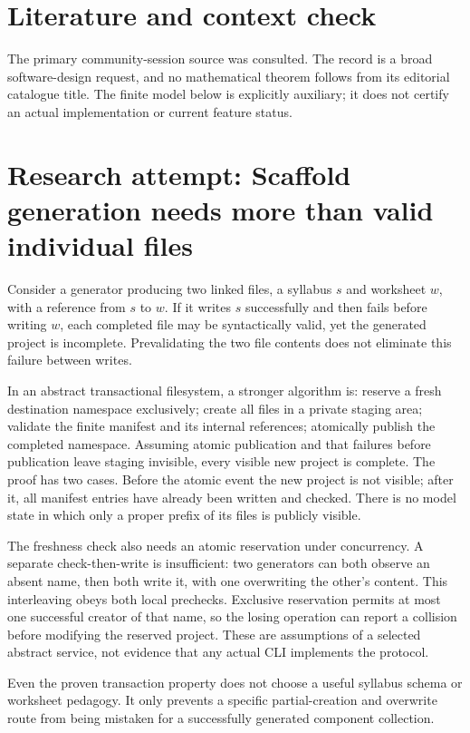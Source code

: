 \documentclass[11pt]{article}
\begin{document}
\section{Literature and context check}
The primary community-session source was consulted. The record is a broad software-design request, and no mathematical theorem follows from its editorial catalogue title. The finite model below is explicitly auxiliary; it does not certify an actual implementation or current feature status.
\section{Research attempt: Scaffold generation needs more than valid individual files}
Consider a generator producing two linked files, a syllabus $s$ and worksheet $w$, with a reference from $s$ to $w$. If it writes $s$ successfully and then fails before writing $w$, each completed file may be syntactically valid, yet the generated project is incomplete. Prevalidating the two file contents does not eliminate this failure between writes.

In an abstract transactional filesystem, a stronger algorithm is: reserve a fresh destination namespace exclusively; create all files in a private staging area; validate the finite manifest and its internal references; atomically publish the completed namespace. Assuming atomic publication and that failures before publication leave staging invisible, every visible new project is complete. The proof has two cases. Before the atomic event the new project is not visible; after it, all manifest entries have already been written and checked. There is no model state in which only a proper prefix of its files is publicly visible.

The freshness check also needs an atomic reservation under concurrency. A separate check-then-write is insufficient: two generators can both observe an absent name, then both write it, with one overwriting the other's content. This interleaving obeys both local prechecks. Exclusive reservation permits at most one successful creator of that name, so the losing operation can report a collision before modifying the reserved project. These are assumptions of a selected abstract service, not evidence that any actual CLI implements the protocol.

Even the proven transaction property does not choose a useful syllabus schema or worksheet pedagogy. It only prevents a specific partial-creation and overwrite route from being mistaken for a successfully generated component collection.
\end{document}
